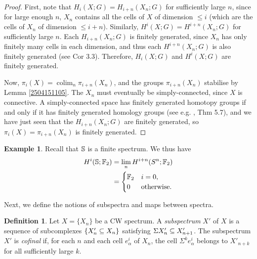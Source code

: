 \documentclass[11pt, titlepage]{article} %
\def\bb{\ensuremath\mathbb}
\def\subq{\ensuremath\subseteq}
\DeclareMathOperator{\colim}{colim}
\numberwithin{equation}{subsection}
\theoremstyle{plain}
\theoremstyle{definition}
\newtheorem{definition}[theorem]{Definition}
\newtheorem{example}[theorem]{Example}
\begin{document}
\begin{proof}
First, note that \(H_i(X;G)=H_{i+n}(X_n;G)\) for sufficiently large \(n\), since for large enough \(n\), \(X_n\) contains all the cells of \(X\) of  dimension \(\leq i\) (which are the cells of \(X_n\) of dimension \(\leq i+n\)). Similarly, \(H^i(X;G)=H^{i+n}(X_n;G)\) for sufficiently large \(n\). Each \(H_{i+n}(X_n;G)\) is finitely generated, since \(X_n\) has only finitely many cells in each dimension, and thus each \(H^{i+n}(X_n;G)\) is also finitely generated (see \autocite{hatcher} Cor 3.3). Therefore, \(H_i(X;G)\) and \(H^i(X;G)\) are finitely generated. 

Now, \(\pi_i(X)=\colim_n \pi_{i+n}(X_n)\), and the groups \(\pi_{i+n}(X_n)\) stabilise by Lemma \ref{2504151105}. The \(X_n\) must eventually be simply-connected, since \(X\) is connective. %
A simply-connected space has finitely generated homotopy groups if and only if it has finitely generated homology groups (see e.g. \autocite{hatcher}, Thm 5.7), and we have just seen that the \(H_{i+n}(X_n;G)\) are finitely generated, so \(\pi_i(X)=\pi_{i+n}(X_n)\) is finitely generated. 
\end{proof}

\begin{example}
Recall that \(\bb{S}\) is a finite spectrum. We thus have
\begin{align*}
H^i(\bb{S}; \bb{F}_2)&=\lim_nH^{i+n}(S^n; \bb{F}_2)\\
&=\begin{cases}
\bb{F}_2 & i = 0,\\
0 & \text{otherwise.}
\end{cases}
\end{align*}
\end{example}

Next, we define the notions of subspectra and maps between spectra.

\begin{definition}
Let \(X=\{X_n\}\) be a CW spectrum. A \textit{subspectrum} \(X'\) of \(X\) is a sequence of subcomplexes \(\{X_n'\subq X_n\}\) satisfying \(\Sigma X_n'\subq X_{n+1}'\). The subspectrum \(X'\) is \textit{cofinal} if, for each \(n\) and each cell \(e^i_\alpha\) of \(X_n\), the cell \(\Sigma^k e_\alpha^i\) belongs to \(X'_{n+k}\) for all sufficiently large \(k\).
\end{definition}
\end{document}
